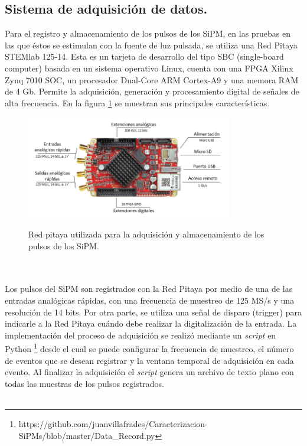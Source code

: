 \subsection{Sistema de adquisición de datos.}
Para el registro y almacenamiento de los pulsos de los SiPM, en las pruebas en las que éstos se estimulan con la fuente de luz pulsada, se utiliza una Red Pitaya STEMlab 125-14. Esta es un tarjeta de desarrollo del tipo SBC (single-board computer) basada en un sistema operativo Linux, cuenta con una FPGA Xilinx Zynq 7010 SOC, un procesador Dual-Core ARM Cortex-A9 y una memora RAM de 4 Gb. Permite la adquisición, generación y procesamiento digital de señales de alta frecuencia. En la figura \ref{fig:Red_pitaya} se muestran sus principales características.   
\begin{figure}[h!]
\begin{centering}
    \caption{Red pitaya utilizada para la adquisición y almacenamiento de los  pulsos de los SiPM.}
    \includegraphics[width=0.8\textwidth]{Images/Red_pitaya.PNG}
    \label{fig:Red_pitaya}
  \par\end{centering}
\end{figure}
\\ \\
Los pulsos del SiPM son registrados con la Red Pitaya por medio de una de las entradas analógicas rápidas, con una frecuencia de muestreo de 125 MS/s y una resolución de 14 bits. Por otra parte, se utiliza una señal de disparo (trigger) para indicarle a la Red Pitaya cuándo debe realizar la digitalización de la entrada. La implementación del proceso de adquisición se realizó mediante un \textit{script} en Python \footnote{https://github.com/juanvillafrades/Caracterizacion-SiPMs/blob/master/Data\_Record.py} %
desde el cual se puede configurar la frecuencia de muestreo, el número de eventos  que se desean registrar y la ventana temporal de adquisición en cada evento. Al finalizar la adquisición el \textit{script} genera un archivo de texto plano con todas las muestras de los pulsos registrados.\\ \\
